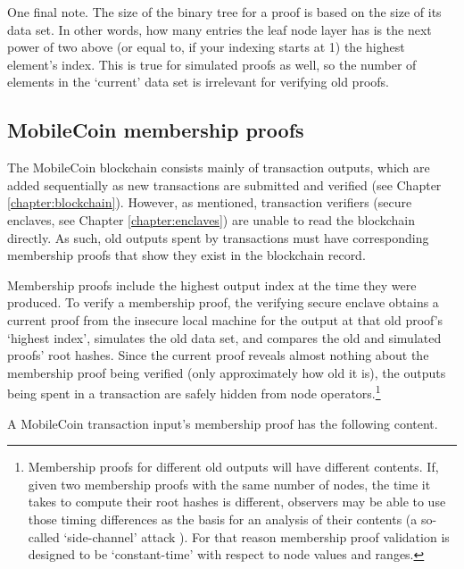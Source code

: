 One final note. The size of the binary tree for a proof is based on the size of its data set. In other words, how many entries the leaf node layer has is the next power of two above (or equal to, if your indexing starts at 1) the highest element's index. This is true for simulated proofs as well, so the number of elements in the `current' data set is irrelevant for verifying old proofs.


\subsection{MobileCoin membership proofs}
\label{subsec:mobilecoin-membership-proofs}

The MobileCoin blockchain consists mainly of transaction outputs, which are added sequentially as new transactions are submitted and verified (see Chapter \ref{chapter:blockchain}). However, as mentioned, transaction verifiers (secure enclaves, see Chapter \ref{chapter:enclaves}) are unable to read the blockchain directly. As such, old outputs spent by transactions must have corresponding membership proofs that show they exist in the blockchain record.

Membership proofs include the highest output index at the time they were produced. To verify a membership proof, the verifying secure enclave obtains a current proof from the insecure local machine for the output at that old proof's `highest index', simulates the old data set, and compares the old and simulated proofs' root hashes. Since the current proof reveals almost nothing about the membership proof being verified (only approximately how old it is), the outputs being spent in a transaction are safely hidden from node operators.\footnote{Membership proofs for different old outputs will have different contents. If, given two membership proofs with the same number of nodes, the time it takes to compute their root hashes is different, observers may be able to use those timing differences as the basis for an analysis of their contents (a so-called `side-channel' attack \cite{nist-side-channel-attack-def}). For that reason membership proof validation is designed to be `constant-time' with respect to node values and ranges.}

A MobileCoin transaction input's membership proof has the following content.

